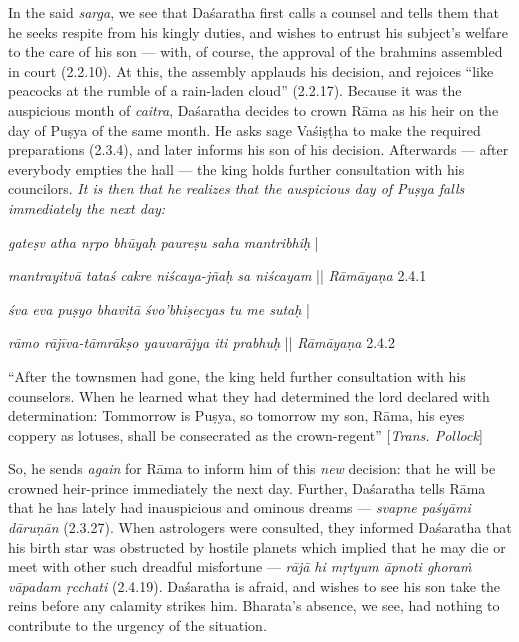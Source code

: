 In the said {\sl sarga}, we see that Daśaratha first calls a counsel and tells them that he seeks respite from his kingly duties, and wishes to entrust his subject’s welfare to the care of his son --- with, of course, the approval of the brahmins assembled in court (2.2.10). At this, the assembly applauds his decision, and rejoices “like peacocks at the rumble of a rain-laden cloud” (2.2.17). Because it was the auspicious month of {\sl caitra}, Daśaratha decides to crown Rāma as his heir on the day of Puṣya of the same month. He asks sage Vaśiṣṭha to make the required preparations (2.3.4), and later informs his son of his decision. Afterwards --- after everybody empties the hall --- the king holds further consultation with his councilors. {\sl It is then that he realizes that the auspicious day of Puṣya falls immediately the next day:}

\begin{myquote}
{{\sl gateṣv atha nṛpo bhūyaḥ paureṣu saha mantribhiḥ}} |

{{\sl mantrayitvā tataś cakre niścaya-jñaḥ sa niścayam}} || {\sl Rāmāyaṇa} 2.4.1

{\sl śva eva puṣyo bhavitā śvo’bhiṣecyas tu me sutaḥ} |

{\sl rāmo rājīva-tāmrākṣo yauvarājya iti prabhuḥ} ||
\qquad\!\! {\sl Rāmāyaṇa} 2.4.2 
\end{myquote}

\begin{myquote}
“After the townsmen had gone, the king held further consultation with his counselors. When he learned what they had determined the lord declared with determination: Tommorrow is Puṣya, so tomorrow my son, Rāma, his eyes coppery as lotuses, shall be consecrated as the crown-regent” [{\sl Trans. Pollock}]
\end{myquote}

So, he sends {\sl again} for Rāma to inform him of this {\sl new} decision: that he will be crowned heir-prince immediately the next day. Further, Daśaratha tells Rāma that he has lately had inauspicious and ominous dreams --- {\sl svapne paśyāmi dāruṇān} (2.3.27). When astrologers were consulted, they informed Daśaratha that his birth star was obstructed by hostile planets which implied that he may die or meet with other such dreadful misfortune --- {\sl rājā hi mṛtyum āpnoti ghoraṁ vāpadam ṛcchati} (2.4.19). Daśaratha is afraid, and wishes to see his son take the reins before any calamity strikes him. Bharata’s absence, we see, had nothing to contribute to the urgency of the situation. 

